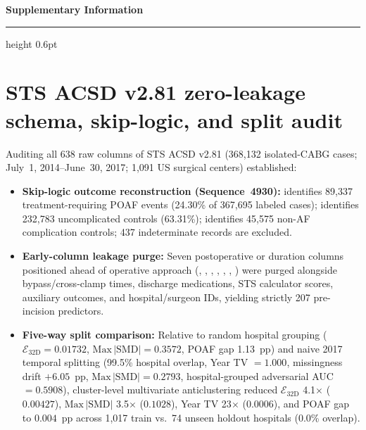 \begin{center}
{\sffamily\bfseries\fontsize{13.5}{16.5}\selectfont\color{teal}Supplementary Information\par}
\vspace{3pt}
{\sffamily\fontsize{10.0}{12.5}\selectfont\color{navy}\papertitle\par}
\vspace{4pt}
{\color{hair}\hrule height 0.6pt}
\end{center}
\vspace{6pt}

\section{STS ACSD v2.81 zero-leakage schema, skip-logic, and split audit}
\label{supp:schema}
Auditing all 638 raw columns of STS ACSD v2.81 (368,132 isolated-CABG cases; July~1, 2014--June~30, 2017; 1,091 US surgical centers) established:
\begin{itemize}
  \item \textbf{Skip-logic outcome reconstruction (Sequence~4930):}  identifies 89,337 treatment-requiring POAF events (24.30\% of 367,695 labeled cases);  identifies 232,783 uncomplicated controls (63.31\%);  identifies 45,575 non-AF complication controls; 437 indeterminate records are excluded.
  \item \textbf{Early-column leakage purge:} Seven postoperative or duration columns positioned ahead of operative approach (, , , , , , ) were purged alongside bypass/cross-clamp times, discharge medications, STS calculator scores, auxiliary outcomes, and hospital/surgeon IDs, yielding strictly 207 pre-incision predictors.
  \item \textbf{Five-way split comparison:} Relative to random hospital grouping ($\mathcal{E}_{32\mathrm{D}} = 0.01732$, $\mathrm{Max}\,|\mathrm{SMD}| = 0.3572$, POAF gap 1.13~pp) and naive 2017 temporal splitting (99.5\% hospital overlap, Year TV $= 1.000$, missingness drift $+6.05$~pp, $\mathrm{Max}\,|\mathrm{SMD}| = 0.2793$, hospital-grouped adversarial AUC $= 0.5908$), cluster-level multivariate anticlustering reduced $\mathcal{E}_{32\mathrm{D}}$ 4.1$\times$ ($0.00427$), $\mathrm{Max}\,|\mathrm{SMD}|$ 3.5$\times$ ($0.1028$), Year TV 23$\times$ ($0.0006$), and POAF gap to $0.004$~pp across 1,017 train vs.\ 74 unseen holdout hospitals (0.0\% overlap).
\end{itemize}

